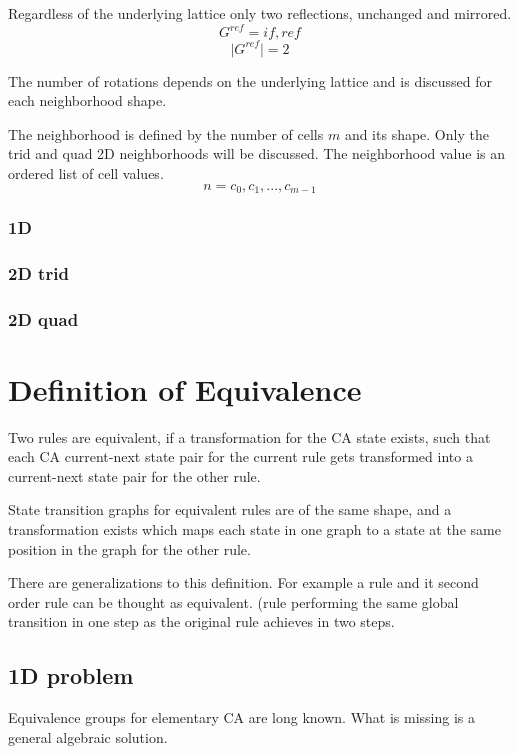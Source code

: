 \documentclass{ijuc}
\begin{document}
Regardless of the underlying lattice only two reflections, unchanged and mirrored.
\[ G^{ref} = {if, ref} \]
\[ \vert G^{ref} \vert = 2 \]

The number of rotations depends on the underlying lattice and is discussed for each neighborhood shape.

The neighborhood is defined by the number of cells \(m\) and its shape.
Only the trid and quad 2D neighborhoods will be discussed.
The neighborhood value is an ordered list of cell values.
\[ n = c_0, c_1, ..., c_{m-1} \]

\subsubsection{1D}

\subsubsection{2D trid}

\subsubsection{2D quad}

\section{Definition of Equivalence}

Two rules are equivalent, if a transformation for the CA state exists, such that each CA
current-next state pair for the current rule gets transformed into a current-next state pair
for the other rule.

State transition graphs for equivalent rules are of the same shape, and a transformation exists
which maps each state in one graph to a state at the same position in the graph for the other rule.

There are generalizations to this definition. For example a rule and it second order rule can be thought as equivalent.
(rule performing the same global transition in one step as the original rule achieves in two steps.

\subsection{1D problem}

Equivalence groups for elementary CA are long known. What is missing is a general algebraic solution.
\end{document}
